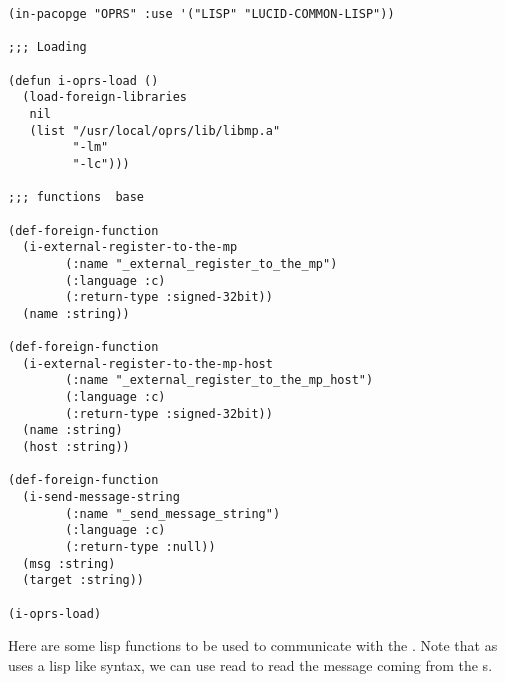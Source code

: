 \begin{verbatim}
(in-pacopge "OPRS" :use '("LISP" "LUCID-COMMON-LISP"))

;;; Loading

(defun i-oprs-load ()
  (load-foreign-libraries
   nil
   (list "/usr/local/oprs/lib/libmp.a"
         "-lm"
         "-lc")))

;;; functions  base

(def-foreign-function
  (i-external-register-to-the-mp
        (:name "_external_register_to_the_mp")
        (:language :c)
        (:return-type :signed-32bit))
  (name :string))

(def-foreign-function
  (i-external-register-to-the-mp-host
        (:name "_external_register_to_the_mp_host")
        (:language :c)
        (:return-type :signed-32bit))
  (name :string)
  (host :string))

(def-foreign-function
  (i-send-message-string
        (:name "_send_message_string")
        (:language :c)
        (:return-type :null))
  (msg :string)
  (target :string))

(i-oprs-load)
\end{verbatim}

Here are some lisp functions to be used to communicate with the
\MP{}. Note that as \COPRS{} uses a lisp like syntax, we can use read to
read the message coming from the \CPK s.

